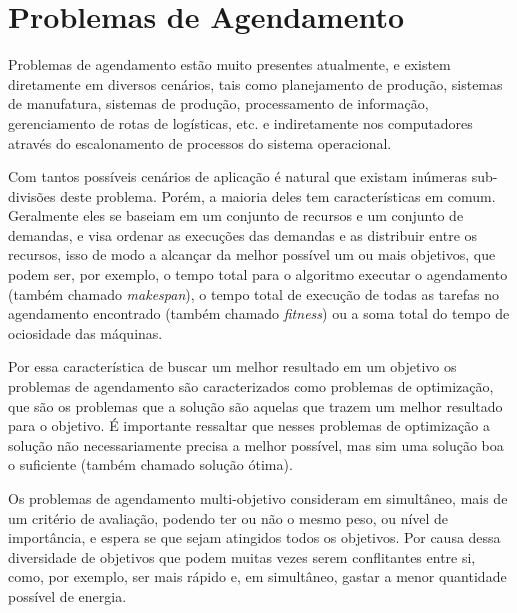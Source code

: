 
\section{Problemas de Agendamento}
        Problemas de agendamento estão muito presentes atualmente, e existem diretamente em diversos cenários, tais como planejamento de produção, sistemas de manufatura, sistemas de produção, processamento de informação, gerenciamento de rotas de logísticas, etc. e indiretamente nos computadores através do escalonamento de processos do sistema operacional.\newline

        Com tantos possíveis cenários de aplicação é natural que existam inúmeras sub-divisões deste problema. Porém, a maioria deles tem características em comum. Geralmente eles se baseiam em um conjunto de recursos e um conjunto de demandas, e visa ordenar as execuções das demandas e as distribuir entre os recursos, isso de modo a alcançar da melhor possível um ou mais objetivos, que podem ser, por exemplo, o tempo total para o algoritmo executar o agendamento (também chamado \textit{makespan}), o tempo total de execução de todas as tarefas no agendamento encontrado (também chamado \textit{fitness}) ou a soma total do tempo de ociosidade das máquinas.\newline

        Por essa característica de buscar um melhor resultado em um objetivo os problemas de agendamento são caracterizados como problemas de optimização, que são os problemas que a solução são aquelas que trazem um melhor resultado para o objetivo. É importante ressaltar que nesses problemas de optimização a solução não necessariamente precisa a melhor possível, mas sim uma solução boa o suficiente (também chamado solução ótima).\newline

        Os problemas de agendamento multi-objetivo consideram em simultâneo, mais de um critério de avaliação, podendo ter ou não o mesmo peso, ou nível de importância, e espera se que sejam atingidos todos os objetivos. Por causa dessa diversidade de objetivos que podem muitas vezes serem conflitantes entre si, como, por exemplo, ser mais rápido e, em simultâneo, gastar a menor quantidade possível de energia.\newline

